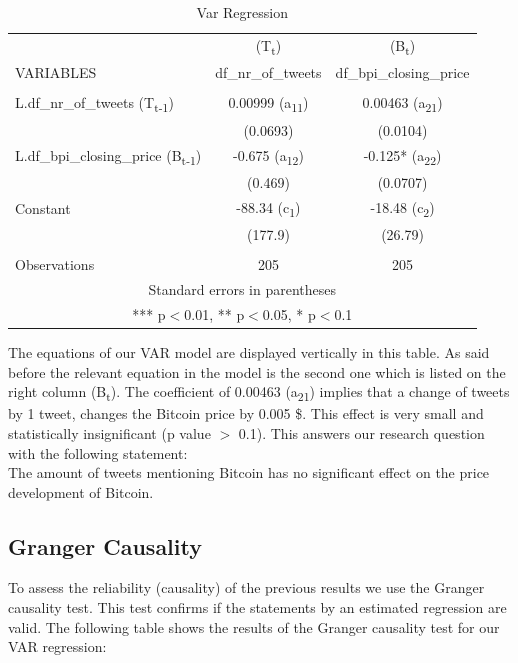 \documentclass[a4paper,american,12pt]{article}
\begin{document}
\begin{spacing}{1.2}
\begin{table}
\centering
	\begin{tabular}{lcc} \hline
	 & (T\textsubscript{t}) & (B\textsubscript{t}) \\
	VARIABLES & df\_nr\_of\_tweets & df\_bpi\_closing\_price \\ \hline
	 &  &  \\
	L.df\_nr\_of\_tweets (T\textsubscript{t-1}) & 0.00999 (a\textsubscript{11}) & 0.00463 (a\textsubscript{21}) \\
	 & (0.0693) & (0.0104) \\
	L.df\_bpi\_closing\_price (B\textsubscript{t-1}) & -0.675 (a\textsubscript{12}) & -0.125* (a\textsubscript{22}) \\
	 & (0.469) & (0.0707) \\
	Constant  & -88.34 (c\textsubscript{1}) & -18.48 (c\textsubscript{2}) \\
	 & (177.9) & (26.79) \\
	 &  &  \\
	 Observations & 205 & 205 \\ \hline
	\multicolumn{3}{c}{ Standard errors in parentheses} \\
	\multicolumn{3}{c}{ *** p$<$0.01, ** p$<$0.05, * p$<$0.1} \\
	\end{tabular}
\caption{Var Regression}
\end{table}

The equations of our VAR model are displayed vertically in this table. As said before the relevant equation in the model is the second one which is listed on the right column (B\textsubscript{t}). The coefficient of 0.00463 (a\textsubscript{21}) implies that a change of tweets by 1 tweet, changes the Bitcoin price by 0.005 \$. This effect is very small and statistically insignificant (p value $>$ 0.1). This answers our research question with the following statement:\\ The amount of tweets mentioning Bitcoin has no significant effect on the price development of Bitcoin.
		
\subsection{Granger Causality}
To assess the reliability (causality) of the previous results we use the Granger causality test. This test confirms if the statements by an estimated regression are valid. The following table shows the results of the Granger causality test for our VAR regression:\\


\end{spacing}
\end{document}
